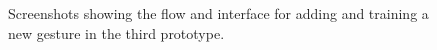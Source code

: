 \begin{figure}[!htb]%
    \centering
    \caption{Screenshots showing the flow and interface for adding and training a new gesture in the third prototype.}
    \label{fig:prototype3-gesture-screenshots}
\end{figure}

